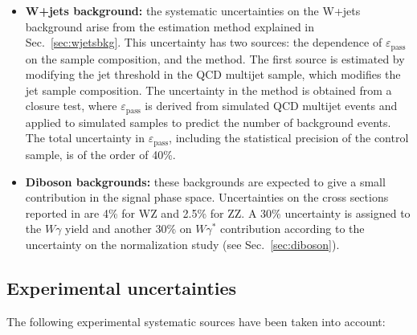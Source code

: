 \begin{itemize}
\item {\bf\boldmath W+jets background:} 
the systematic uncertainties on the W+jets background arise from the estimation method explained in Sec.~\ref{sec:wjetsbkg}. This uncertainty has two sources: the dependence of $\varepsilon_\mathrm{pass}$ on the sample composition, and the method. The first source is estimated by modifying the jet \pt threshold in the QCD multijet sample, which modifies the jet sample composition.  The uncertainty in the method is obtained from a closure test, where $\varepsilon_\mathrm{pass}$ is derived from simulated QCD multijet events and applied to simulated samples to predict the number of background events. The total uncertainty in $\varepsilon_\mathrm{pass}$, including the statistical precision of the control sample, is of the order of 40\%.
 
\item {\bf\boldmath Diboson backgrounds:} 
these backgrounds are expected to give a small contribution in the signal phase space. Uncertainties on the cross sections reported in \cite{xsecSM,bib:ellis} are 4\% for WZ and 2.5\% for ZZ. A 30\% uncertainty is assigned to the $W\gamma$ \cite{WgammaXsec} yield and another 30\% on $W\gamma^{*}$ contribution according to the uncertainty on the normalization study (see Sec.~\ref{sec:diboson}).
      
\end{itemize}

\subsection{Experimental uncertainties \label{subsec:expsyst}}

The following experimental systematic sources have been taken into account:

